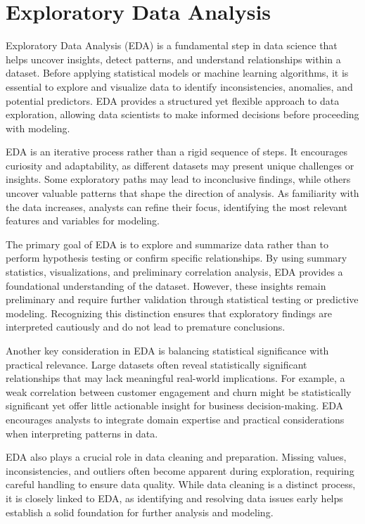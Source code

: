 \documentclass[
]{book}
\theoremstyle{definition}
\theoremstyle{definition}
\theoremstyle{definition}
\theoremstyle{definition}
\theoremstyle{remark}
\begin{document}
\chapter{Exploratory Data Analysis}\label{chapter-EDA}

Exploratory Data Analysis (EDA) is a fundamental step in data science that helps uncover insights, detect patterns, and understand relationships within a dataset. Before applying statistical models or machine learning algorithms, it is essential to explore and visualize data to identify inconsistencies, anomalies, and potential predictors. EDA provides a structured yet flexible approach to data exploration, allowing data scientists to make informed decisions before proceeding with modeling.

EDA is an iterative process rather than a rigid sequence of steps. It encourages curiosity and adaptability, as different datasets may present unique challenges or insights. Some exploratory paths may lead to inconclusive findings, while others uncover valuable patterns that shape the direction of analysis. As familiarity with the data increases, analysts can refine their focus, identifying the most relevant features and variables for modeling.

The primary goal of EDA is to explore and summarize data rather than to perform hypothesis testing or confirm specific relationships. By using summary statistics, visualizations, and preliminary correlation analysis, EDA provides a foundational understanding of the dataset. However, these insights remain preliminary and require further validation through statistical testing or predictive modeling. Recognizing this distinction ensures that exploratory findings are interpreted cautiously and do not lead to premature conclusions.

Another key consideration in EDA is balancing statistical significance with practical relevance. Large datasets often reveal statistically significant relationships that may lack meaningful real-world implications. For example, a weak correlation between customer engagement and churn might be statistically significant yet offer little actionable insight for business decision-making. EDA encourages analysts to integrate domain expertise and practical considerations when interpreting patterns in data.

EDA also plays a crucial role in data cleaning and preparation. Missing values, inconsistencies, and outliers often become apparent during exploration, requiring careful handling to ensure data quality. While data cleaning is a distinct process, it is closely linked to EDA, as identifying and resolving data issues early helps establish a solid foundation for further analysis and modeling.
\end{document}
